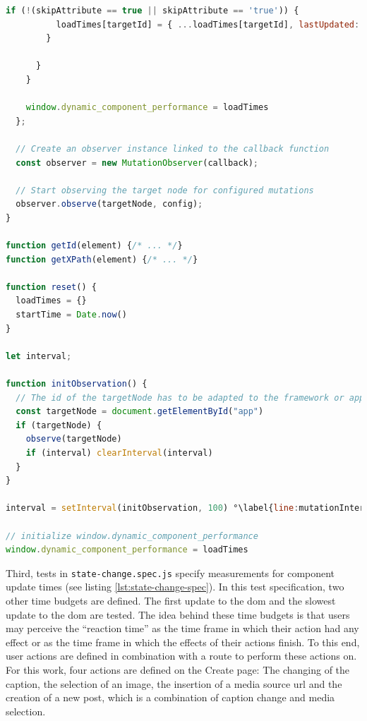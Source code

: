 \documentclass[a4paper, 12pt]{article}
\begin{document}
\begin{lstlisting}[caption={Injected mutation recorder script}, label={lst:performance-recorder}, language=JavaScript, escapechar=°]
        if (!(skipAttribute == true || skipAttribute == 'true')) {
          loadTimes[targetId] = { ...loadTimes[targetId], lastUpdated: Date.now() - startTime, xpath: loadTimes[targetId]?.xpath || getXPath(mutation.target) }
        }

      }
    }

    window.dynamic_component_performance = loadTimes
  };

  // Create an observer instance linked to the callback function
  const observer = new MutationObserver(callback);

  // Start observing the target node for configured mutations
  observer.observe(targetNode, config);
}

function getId(element) {/* ... */}
function getXPath(element) {/* ... */}

function reset() {
  loadTimes = {}
  startTime = Date.now()
}

let interval;

function initObservation() {
  // The id of the targetNode has to be adapted to the framework or application
  const targetNode = document.getElementById("app")
  if (targetNode) {
    observe(targetNode)
    if (interval) clearInterval(interval)
  }
}

interval = setInterval(initObservation, 100) °\label{line:mutationInterval}°

// initialize window.dynamic_component_performance
window.dynamic_component_performance = loadTimes
\end{lstlisting}
\vspace{1cm}

Third, tests in \verb|state-change.spec.js| specify measurements for component update times (see listing \ref{lst:state-change-spec}).
In this test specification, two other time budgets are defined.
The first update to the \acrshort{dom} and the slowest update to the \acrshort{dom} are tested.
The idea behind these time budgets is that users may perceive the \enquote{reaction time} as the time frame in which their action had any effect or as the time frame in which the effects of their actions finish.
To this end, user actions are defined in combination with a route to perform these actions on.
For this work, four actions are defined on the Create page: The changing of the caption, the selection of an image, the insertion of a media source \acrshort{url} and the creation of a new post, which is a combination of caption change and media selection.
\end{document}
